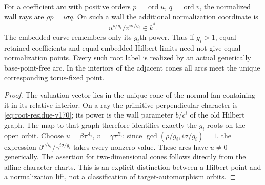 \begin{corollary}
\label{cor:hilbert-lifts-v170}
For a coefficient arc with positive orders $p=\operatorname{ord}u$,
$q=\operatorname{ord}v$, the normalized wall rays are
$\rho p=i\sigma q$. On such a wall the additional normalization
coordinate is
\[
 \overline{u^{\rho/g_i}/v^{i\sigma/g_i}}\in k^*.
\]
The embedded curve remembers only its $g_i$th power. Thus if
$g_i>1$, equal retained coefficients and equal embedded Hilbert
limits need not give equal normalization points. Every such root
label is realized by an actual generically base-point-free arc.
In the interiors of the adjacent cones all arcs meet the unique
corresponding torus-fixed point.
\end{corollary}
\begin{proof}
The valuation vector lies in the unique cone of the normal fan
containing it in its relative interior. On a ray the primitive
perpendicular character is \eqref{eq:root-residue-v170}; its power
is the wall parameter $b/c^i$ of the old Hilbert graph. The map to
that graph therefore identifies exactly the $g_i$ roots on the
open orbit. Choose $u=\beta\tau^{A_i}$,
$v=\gamma\tau^{B_i}$; since
$\gcd(\rho/g_i,i\sigma/g_i)=1$, the expression
$\beta^{\rho/g_i}/\gamma^{i\sigma/g_i}$ takes every nonzero value.
These arcs have $u\ne0$ generically. The assertion for two-dimensional
cones follows directly from the affine character charts. This is an
explicit distinction between a Hilbert point and a normalization
lift, not a classification of target-automorphism orbits.
\end{proof}
